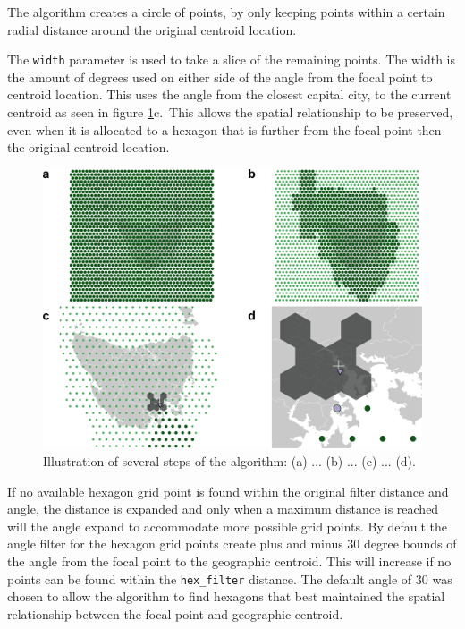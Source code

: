 The algorithm creates a circle of points, by only keeping points within
a certain radial distance around the original centroid location.

The \texttt{width} parameter is used to take a slice of the remaining
points. The width is the amount of degrees used on either side of the
angle from the focal point to centroid location. This uses the angle
from the closest capital city, to the current centroid as seen in figure
\ref{fig:filterprocess}c.~This allows the spatial relationship to be
preserved, even when it is allocated to a hexagon that is further from
the focal point then the original centroid location.

\begin{Schunk}
\begin{figure}
\includegraphics[width=0.95\linewidth]{kobakian-cook_files/figure-latex/filterprocess-1} \caption[Illustration of several steps of the algorithm]{Illustration of several steps of the algorithm: (a) ... (b) ... (c) ... (d). }\label{fig:filterprocess}
\end{figure}
\end{Schunk}

If no available hexagon grid point is found within the original filter
distance and angle, the distance is expanded and only when a maximum
distance is reached will the angle expand to accommodate more possible
grid points. By default the angle filter for the hexagon grid points
create plus and minus 30 degree bounds of the angle from the focal point
to the geographic centroid. This will increase if no points can be found
within the \texttt{hex\_filter} distance. The default angle of 30 was
chosen to allow the algorithm to find hexagons that best maintained the
spatial relationship between the focal point and geographic centroid.

